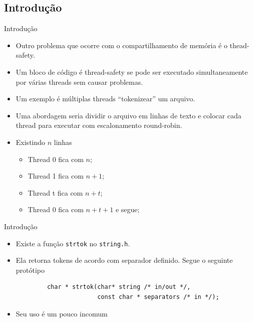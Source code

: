 	\subsection{Introdução}
	\begin{frame}[fragile]{Introdução}
		\begin{itemize}
			\item Outro problema que ocorre com o compartilhamento de memória é o thead-safety.
			\item Um bloco de código é thread-safety se pode ser executado simultaneamente por várias threads sem causar problemas.
			\item Um exemplo é múltiplas threads ``tokenizear'' um arquivo.
			\item Uma abordagem seria dividir o arquivo em linhas de texto e colocar cada thread para executar com escalonamento round-robin.
			\item Existindo $n$ linhas
			\begin{itemize}
				\item Thread 0 fica com $n$;
				\item Thread 1 fica com $n+1$;
				\item Thread t fica com $n+t$;
				\item Thread 0 fica com $n+t+1$ e segue;
			\end{itemize}
		\end{itemize}
\end{frame}

	\begin{frame}[fragile]{Introdução}
		\begin{itemize}
			\item Existe a função {\tt strtok} no {\tt string.h}.
			\item Ela retorna tokens de acordo com separador definido. Segue o seguinte protótipo
		\end{itemize}
		\begin{verbatim}
			char * strtok(char* string /* in/out */, 
						  const char * separators /* in */);
		\end{verbatim}
		\begin{itemize}
			\item Seu uso é um pouco incomum
		\end{itemize}
\end{frame}

